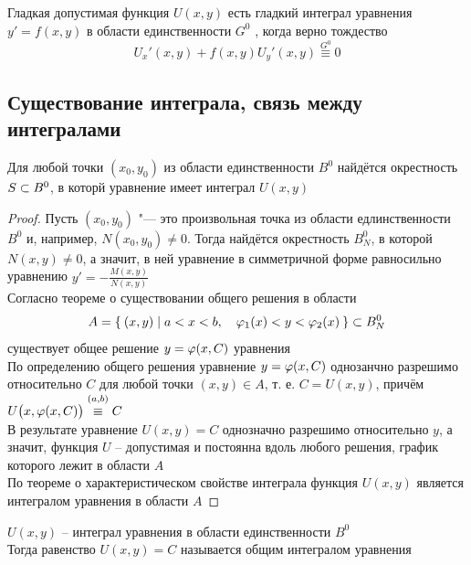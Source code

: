 \begin{implication}
    Гладкая допустимая функция $ U(x, y) $ есть гладкий интеграл уравнения  $ y' = f(x, y) $ в области единственности $ G^0 $ , когда верно тождество
    $$ U_x'(x, y) + f(x, y)U_y'(x, y) \overset{G^0}\equiv 0 $$
\end{implication}

\subsection{Существование интеграла, связь между интегралами}

\begin{theorem}
    Для любой точки $ (x_0, y_0) $ из области единственности $ B^0 $ найдётся окрестность $ S \subset B^0 $, в которй уравнение  имеет интеграл $ U(x, y) $
\end{theorem}

\begin{proof}
    Пусть $ (x_0, y_0) $ "--- это произвольная точка из области едлинственности $ B^0 $ и, например, $ N(x_0, y_0) \ne 0 $. Тогда найдётся окрестность $ B_N^0 $, в которой $ N(x, y) \ne 0 $, а значит, в ней уравнение в симметричной форме  равносильно уравнению  $ y' = - \frac{M(x, y)}{N(x, y)} $ \\
    Согласно теореме о существовании общего решения в области
    $$ A = \Set{(x,y) | a < x < b, \quad \varphi_1(x) < y < \varphi_2(x)} \subset B_N^0 $$
    существует общее решение $ y = \varphi(x, C) $ уравнения  \\
    По определению общего решения уравнение $ y = \varphi(x, C) $ однозанчно разрешимо относительно $ C $ для любой точки $ (x, y) \in A $, т. е. $ C = U(x, y) $, причём $ U \big( x, \vphi(x, C) \big) \overset{(a, b)}\equiv C $ \\
    В результате уравнение $ U(x, y) = C $ однозначно разрешимо относительно $ y $, а значит, функция $ U $ -- допустимая и постоянна вдоль любого решения, график которого лежит в области $ A $ \\
    По теореме о характеристическом свойстве интеграла функция $ U(x, y) $ является интегралом уравнения  в области $ A $
\end{proof}

\begin{definition}
    $ U(x, y) $ -- интеграл уравнения  в области единственности $ B^0 $ \\
    Тогда равенство $ U(x, y) = C $ называется общим интегралом уравнения 
\end{definition}

